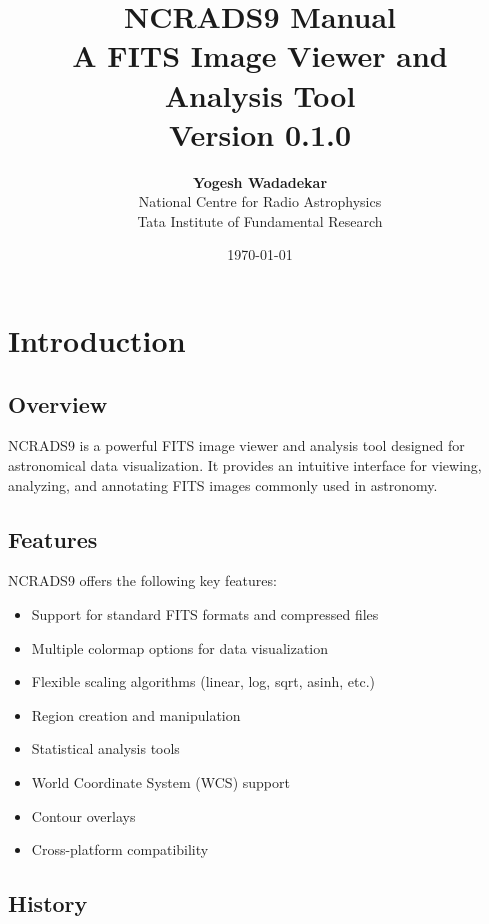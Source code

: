 \documentclass[11pt,a4paper]{report}
\title{
    \vspace{2cm}
    {\Huge\textbf{NCRADS9 Manual}}\\[1cm]
    {\Large A FITS Image Viewer and Analysis Tool}\\[2cm]
    {\large Version 0.1.0}
}
\author{
    \textbf{Yogesh Wadadekar}\\[0.5cm]
    National Centre for Radio Astrophysics\\
    Tata Institute of Fundamental Research
}
\date{\today}
\begin{document}
\maketitle
\thispagestyle{empty}
\newpage

\tableofcontents
\newpage

\listoffigures
\listoftables
\newpage

\chapter{Introduction}

\section{Overview}

NCRADS9 is a powerful FITS image viewer and analysis tool designed for astronomical data visualization. It provides an intuitive interface for viewing, analyzing, and annotating FITS images commonly used in astronomy.

\section{Features}

NCRADS9 offers the following key features:

\begin{itemize}
    \item Support for standard FITS formats and compressed files
    \item Multiple colormap options for data visualization
    \item Flexible scaling algorithms (linear, log, sqrt, asinh, etc.)
    \item Region creation and manipulation
    \item Statistical analysis tools
    \item World Coordinate System (WCS) support
    \item Contour overlays
    \item Cross-platform compatibility
\end{itemize}

\section{History}
\end{document}
